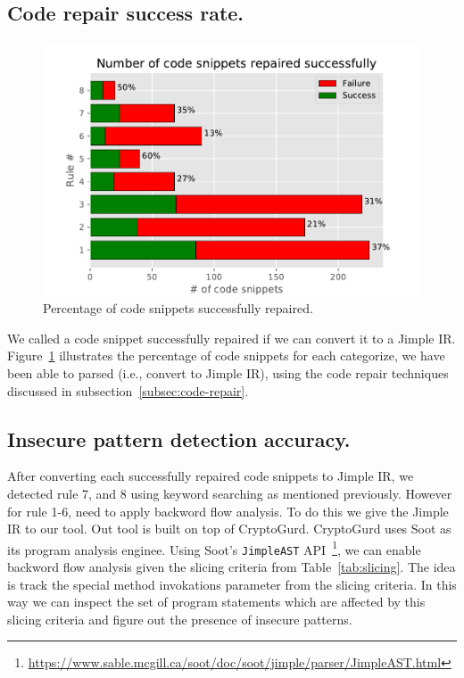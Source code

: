 \subsection{Code repair success rate.} 
\begin{figure}[ht]
\includegraphics[width=\linewidth]{Figures/success_full_repair2.eps-eps-converted-to.pdf}
\caption{Percentage of code snippets successfully repaired.}
\label{fig:code-repair}
\end{figure}

We called a code snippet successfully repaired if we can convert it to a Jimple IR. Figure~\ref{fig:code-repair} illustrates the percentage of code snippets for each categorize, we have been able to parsed (i.e., convert to Jimple IR), using the code repair techniques discussed in subsection~\ref{subsec:code-repair}.  
\subsection{Insecure pattern detection accuracy.}
After converting each successfully repaired code snippets to Jimple IR, we detected rule 7, and 8 using keyword searching as mentioned previously. However for rule 1-6, need to apply backword flow analysis. To do this we give the Jimple IR to our tool. Out tool is built on top of CryptoGurd. CryptoGurd uses Soot as its program analysis enginee. Using Soot's \texttt{JimpleAST} API~\footnote{\url{https://www.sable.mcgill.ca/soot/doc/soot/jimple/parser/JimpleAST.html}}, we can enable backword flow analysis given the slicing criteria from Table~\ref{tab:slicing}. The idea is track the special method invokations parameter from the slicing criteria. In this way we can inspect the set of program statements which are affected by this slicing criteria and figure out the presence of insecure patterns. 


